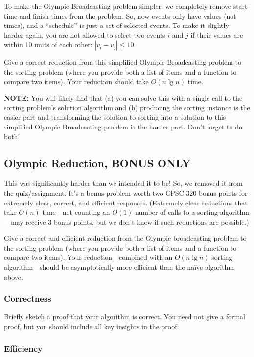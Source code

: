 \documentclass[11pt, oneside]{article}   	%
\theoremstyle{definition}
\theoremstyle{remark}
\begin{document}
To make the Olympic Broadcasting problem simpler, we completely remove
start time and finish times from the problem. So, now events only have
values (not times), and a ``schedule'' is just a set of selected
events. To make it slightly harder again, you are not allowed to
select two events $i$ and $j$ if their values are within 10 units of
each other: $|v_i - v_j| \leq 10$.

Give a correct reduction from this simplified Olympic Broadcasting
problem to the sorting problem (where you provide both a list of items
and a function to compare two items). Your reduction should take $O(n
\lg n)$ time.

\textbf{NOTE:} You will likely find that (a) you can solve this with a single
call to the sorting problem's solution algorithm and (b) producing the
sorting instance is the easier part and transforming the solution to
sorting into a solution to this simplified Olympic Broadcasting
problem is the harder part. Don't forget to do both!
\subsection{Olympic Reduction, BONUS ONLY}

This was significantly harder than we intended it to be! So, we
removed it from the quiz/assignment. It's a bonus problem worth two
CPSC 320 bonus points for extremely clear, correct, and efficient
responses. (Extremely clear reductions that take $O(n)$ time---not
counting an $O(1)$ number of calls to a sorting algorithm---may
receive 3 bonus points, but we don't know if such reductions are
possible.)

Give a correct and efficient reduction from the Olympic broadcasting
problem to the sorting problem (where you provide both a list of items
and a function to compare two items). Your reduction---combined with
an $O(n \lg n)$ sorting algorithm---should be asymptotically more
efficient than the na\"ive algorithm above.
\subsubsection{Correctness}

Briefly sketch a proof that your algorithm is correct. You need not
give a formal proof, but you should include all key insights in the
proof.
\subsubsection{Efficiency}
\end{document}
